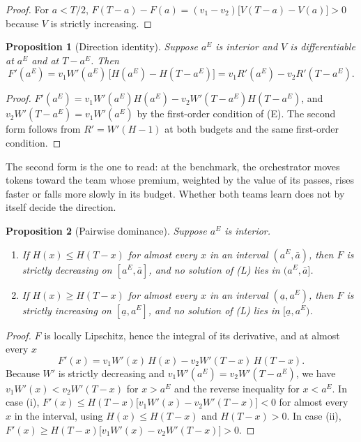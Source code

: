 \documentclass[11pt]{article}
\newtheorem{proposition}{Proposition}
\theoremstyle{definition}
\begin{document}
\begin{proof}
For $a<T/2$, $F(T-a)-F(a)=(v_1-v_2)\bigl[V(T-a)-V(a)\bigr]>0$ because $V$ is strictly increasing.
\end{proof}

\begin{proposition}[Direction identity]\label{prop:identity}
Suppose $a^E$ is interior and $V$ is differentiable at $a^E$ and at $T-a^E$. Then
\[
F'(a^E)=v_1W'(a^E)\,\bigl[H(a^E)-H(T-a^E)\bigr]=v_1R'(a^E)-v_2R'(T-a^E).
\]
\end{proposition}

\begin{proof}
$F'(a^E)=v_1W'(a^E)H(a^E)-v_2W'(T-a^E)H(T-a^E)$, and $v_2W'(T-a^E)=v_1W'(a^E)$ by the first-order condition of (E). The second form follows from $R'=W'(H-1)$ at both budgets and the same first-order condition.
\end{proof}

The second form is the one to read: at the benchmark, the orchestrator moves tokens toward the team whose premium, weighted by the value of its passes, rises faster or falls more slowly in its budget. Whether both teams learn does not by itself decide the direction.

\begin{proposition}[Pairwise dominance]\label{prop:pairwise}
Suppose $a^E$ is interior.
\begin{enumerate}
\item[(i)] If $H(x)\le H(T-x)$ for almost every $x$ in an interval $(a^E,\bar a)$, then $F$ is strictly decreasing on $[a^E,\bar a]$, and no solution of (L) lies in $(a^E,\bar a]$.
\item[(ii)] If $H(x)\ge H(T-x)$ for almost every $x$ in an interval $(\underline a,a^E)$, then $F$ is strictly increasing on $[\underline a,a^E]$, and no solution of (L) lies in $[\underline a,a^E)$.
\end{enumerate}
\end{proposition}

\begin{proof}
$F$ is locally Lipschitz, hence the integral of its derivative, and at almost every $x$
\[
F'(x)=v_1W'(x)\,H(x)-v_2W'(T-x)\,H(T-x).
\]
Because $W'$ is strictly decreasing and $v_1W'(a^E)=v_2W'(T-a^E)$, we have $v_1W'(x)<v_2W'(T-x)$ for $x>a^E$ and the reverse inequality for $x<a^E$. In case (i), $F'(x)\le H(T-x)\bigl[v_1W'(x)-v_2W'(T-x)\bigr]<0$ for almost every $x$ in the interval, using $H(x)\le H(T-x)$ and $H(T-x)>0$. In case (ii), $F'(x)\ge H(T-x)\bigl[v_1W'(x)-v_2W'(T-x)\bigr]>0$.
\end{proof}
\end{document}
